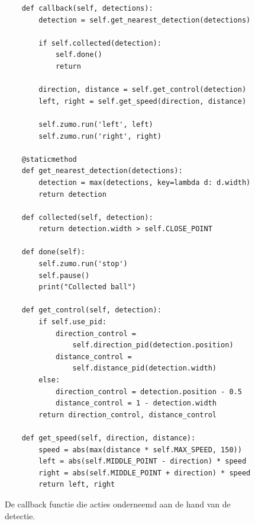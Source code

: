\begin{figure}[H]
    \centering
    \begin{verbatim}
    def callback(self, detections):
        detection = self.get_nearest_detection(detections)
        
        if self.collected(detection):
            self.done()
            return
        
        direction, distance = self.get_control(detection)
        left, right = self.get_speed(direction, distance)
        
        self.zumo.run('left', left)
        self.zumo.run('right', right)
    
    @staticmethod
    def get_nearest_detection(detections):
        detection = max(detections, key=lambda d: d.width)
        return detection
    
    def collected(self, detection):
        return detection.width > self.CLOSE_POINT
    
    def done(self):
        self.zumo.run('stop')
        self.pause()
        print("Collected ball")
    
    def get_control(self, detection):
        if self.use_pid:
            direction_control = 
                self.direction_pid(detection.position)
            distance_control = 
                self.distance_pid(detection.width)
        else:
            direction_control = detection.position - 0.5
            distance_control = 1 - detection.width
        return direction_control, distance_control
    
    def get_speed(self, direction, distance):
        speed = abs(max(distance * self.MAX_SPEED, 150))
        left = abs(self.MIDDLE_POINT - direction) * speed
        right = abs(self.MIDDLE_POINT + direction) * speed
        return left, right
    \end{verbatim}
    \caption{De callback functie die acties onderneemd aan de hand van de detectie.}
    \label{fig:callback}
\end{figure}

